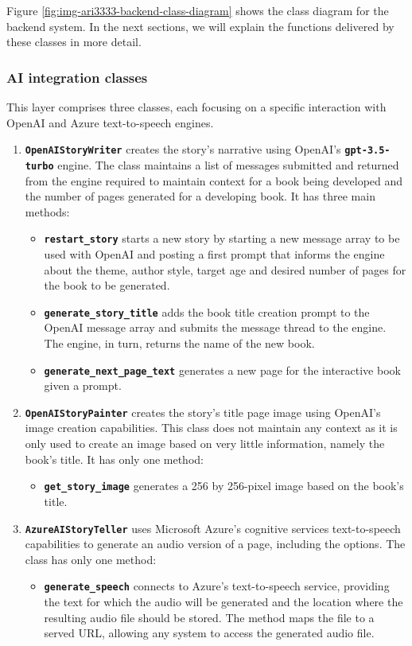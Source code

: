 \documentclass[conference]{IEEEtran}
\begin{document}
	
	Figure \ref{fig:img-ari3333-backend-class-diagram} shows the class diagram for the backend system. In the next sections, we will explain the functions delivered by these classes in more detail.
	
	
	
	\subsubsection{AI integration classes}
	
	This layer comprises three classes, each focusing on a specific interaction with OpenAI and Azure text-to-speech engines.
	
	\begin{enumerate}
		\item \textbf{\texttt{OpenAIStoryWriter}} creates the story's narrative using OpenAI's \textbf{\texttt{gpt-3.5-turbo}} engine. The class maintains a list of messages submitted and returned from the engine required to maintain context for a book being developed and the number of pages generated for a developing book. It has three main methods:
		\begin{itemize}
			\item\textbf{\texttt{restart\_story}} starts a new story by starting a new message array to be used with OpenAI and posting a first prompt that informs the engine about the theme, author style, target age and desired number of pages for the book to be generated.
			\item\textbf{\texttt{generate\_story\_title}} adds the book title creation prompt to the OpenAI message array and submits the message thread to the engine. The engine, in turn, returns the name of the new book.
			\item\textbf{\texttt{generate\_next\_page\_text}} generates a new page for the interactive book given a prompt.
		\end{itemize}
		\item\textbf{\texttt{OpenAIStoryPainter}} creates the story's title page image using OpenAI's image creation capabilities. This class does not maintain any context as it is only used to create an image based on very little information, namely the book's title. It has only one method:
		\begin{itemize}
			\item\textbf{\texttt{get\_story\_image}} generates a 256 by 256-pixel image based on the book's title.
		\end{itemize}
		\item\textbf{\texttt{AzureAIStoryTeller}} uses Microsoft Azure's cognitive services text-to-speech capabilities to generate an audio version of a page, including the options. The class has only one method:
		\begin{itemize}
			\item\textbf{\texttt{generate\_speech}} connects to Azure's text-to-speech service, providing the text for which the audio will be generated and the location where the resulting audio file should be stored. The method maps the file to a served URL, allowing any system to access the generated audio file.
		\end{itemize}
	\end{enumerate}
	
\end{document}
